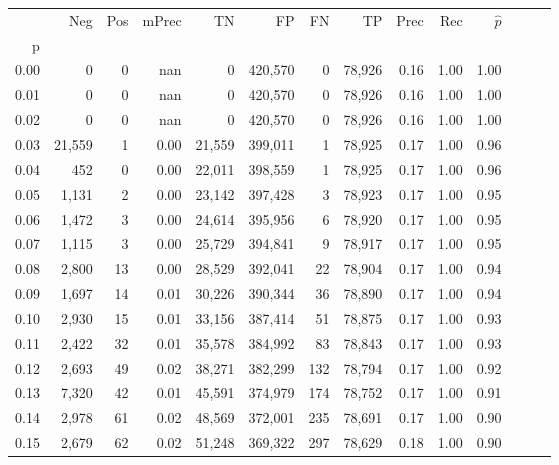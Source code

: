 \begin{tabular}{rrrrrrrrrrrrrr}
\toprule
{} &     Neg &    Pos & mPrec &       TN &       FP &      FN &      TP &  Prec &   Rec & $\hat{p}$ \\
p    &         &        &       &          &          &         &         &       &       &           \\
\midrule
0.00 &       0 &      0 &   nan &        0 &  420,570 &       0 &  78,926 &  0.16 &  1.00 &      1.00 \\
0.01 &       0 &      0 &   nan &        0 &  420,570 &       0 &  78,926 &  0.16 &  1.00 &      1.00 \\
0.02 &       0 &      0 &   nan &        0 &  420,570 &       0 &  78,926 &  0.16 &  1.00 &      1.00 \\
0.03 &  21,559 &      1 &  0.00 &   21,559 &  399,011 &       1 &  78,925 &  0.17 &  1.00 &      0.96 \\
0.04 &     452 &      0 &  0.00 &   22,011 &  398,559 &       1 &  78,925 &  0.17 &  1.00 &      0.96 \\
0.05 &   1,131 &      2 &  0.00 &   23,142 &  397,428 &       3 &  78,923 &  0.17 &  1.00 &      0.95 \\
0.06 &   1,472 &      3 &  0.00 &   24,614 &  395,956 &       6 &  78,920 &  0.17 &  1.00 &      0.95 \\
0.07 &   1,115 &      3 &  0.00 &   25,729 &  394,841 &       9 &  78,917 &  0.17 &  1.00 &      0.95 \\
0.08 &   2,800 &     13 &  0.00 &   28,529 &  392,041 &      22 &  78,904 &  0.17 &  1.00 &      0.94 \\
0.09 &   1,697 &     14 &  0.01 &   30,226 &  390,344 &      36 &  78,890 &  0.17 &  1.00 &      0.94 \\
0.10 &   2,930 &     15 &  0.01 &   33,156 &  387,414 &      51 &  78,875 &  0.17 &  1.00 &      0.93 \\
0.11 &   2,422 &     32 &  0.01 &   35,578 &  384,992 &      83 &  78,843 &  0.17 &  1.00 &      0.93 \\
0.12 &   2,693 &     49 &  0.02 &   38,271 &  382,299 &     132 &  78,794 &  0.17 &  1.00 &      0.92 \\
0.13 &   7,320 &     42 &  0.01 &   45,591 &  374,979 &     174 &  78,752 &  0.17 &  1.00 &      0.91 \\
0.14 &   2,978 &     61 &  0.02 &   48,569 &  372,001 &     235 &  78,691 &  0.17 &  1.00 &      0.90 \\
0.15 &   2,679 &     62 &  0.02 &   51,248 &  369,322 &     297 &  78,629 &  0.18 &  1.00 &      0.90 \\

\end{tabular}
